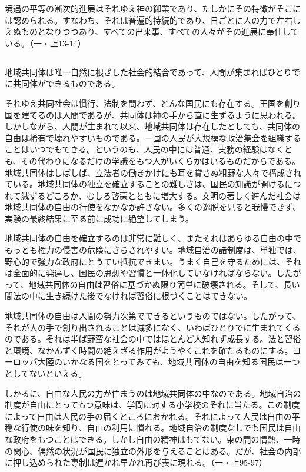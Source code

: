 境遇の平等の漸次的進展はそれゆえ神の御業であり、たしかにその特徴がそこには認められる。すなわち、それは普遍的持続的であり、日ごとに人の力で左右しえぬものとなりつつあり、すべての出来事、すべての人々がその進展に奉仕している。（一・上13-14）

\subsection{}



地域共同体は唯一自然に根ざした社会的結合であって、人間が集まればひとりでに共同体ができるものである。

それゆえ共同社会は慣行、法制を問わず、どんな国民にも存在する。王国を創り国を建てるのは人間であるが、共同体は神の手から直に生ずるように思われる。しかしながら、人間が生まれて以来、地域共同体は存在したとしても、共同体の自由は稀有で壊れやすいものである。一国の人民が大規模な政治集会を組織することはいつでもできる。というのも、人民の中には普通、実務の経験はなくとも、その代わりになるだけの学識をもつ人がいくらかはいるものだからである。地域共同体はしばしば、立法者の働きかけにも耳を貸さぬ粗野な人々で構成されている。地域共同体の独立を確立することの難しさは、国民の知識が開けるにつれて減ずるどころか、むしろ啓蒙とともに増大する。文明の著しく進んだ社会は地域共同体の自由の行使をなかなか許さない。多くの逸脱を見ると我慢できず、実験の最終結果に至る前に成功に絶望してしまう。

地域共同体の自由を確立するのは非常に難しく、またそれはあらゆる自由の中でもっとも権力の侵害の危険にさらされやすい。地域自治の諸制度は、単独では、野心的で強力な政府にとうてい抵抗できまい。うまく自己を守るためには、それは全面的に発達し、国民の思想や習慣と一体化していなければならない。したがって、地域共同体の自由は習俗に基づかぬ限り簡単に破壊される。そして、長い間法の中に生き続けた後でなければ習俗に根づくことはできない。

地域共同体の自由は人間の努力次第でできるというものではない。したがって、それが人の手で創り出されることは滅多になく、いわばひとりでに生まれてくるのである。それは半ば野蛮な社会の中ではほとんど人知れず成長する。法と習俗と環境、なかんずく時間の絶えざる作用がようやくこれを確たるものにする。ヨーロッパ大陸のいかなる国をとってみても、地域共同体の自由を知る国民は一つとしてないといえる。

しかるに、自由な人民の力が住まうのは地域共同体の中なのである。地域自治の制度が自由にとってもつ意味は、学問に対する小学校のそれに当たる。この制度によって自由は人民の手の届くところにおかれる。それによって人民は自由の平穏な行使の味を知り、自由の利用に慣れる。地域自治の制度なしでも国民は自由な政府をもつことはできる。しかし自由の精神はもてない。束の間の情熱、一時の関心、偶然の状況が国民に独立の外形を与えることはある。だが、社会の内部に押し込められた専制は遅かれ早かれ再び表に現れる。（一・上95-97）


